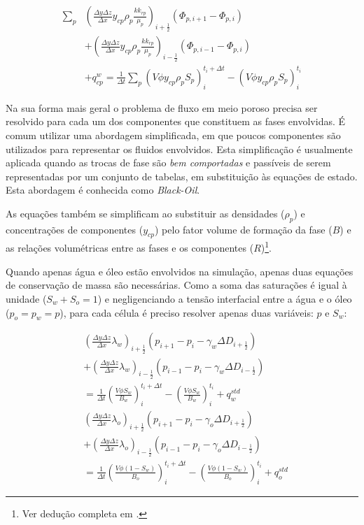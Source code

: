 \documentclass[final,5p]{elsarticle}
\numberwithin{equation}{section}
\begin{document}
        \begin{align}
            \sum_{p} & \left( \frac{\Delta y \Delta z}{\Delta x} y_{cp} \rho_p \frac{k k_{rp}}{\mu_p} \right)_{i+\tfrac{1}{2}} (\Phi_{p,i+1} - \Phi_{p,i})  \nonumber \\
            & + \left( \frac{\Delta y \Delta z}{\Delta x} y_{cp} \rho_p \frac{k k_{rp}}{\mu_p} \right)_{i-\tfrac{1}{2}} (\Phi_{p,i-1} - \Phi_{p,i}) \nonumber \\
            & + q_{cp}^{w} = \frac{1}{\Delta t} \sum_{p} (V \phi y_{cp} \rho_p S_p)_i^{t_i+\Delta t} - (V \phi y_{cp} \rho_p S_p)_i^{t_i} \label{eq:geralumd}
        \end{align}

        Na sua forma mais geral o problema de fluxo em meio poroso precisa ser resolvido para cada um dos componentes que constituem as fases envolvidas. É comum utilizar uma abordagem simplificada, em que poucos componentes são utilizados para representar os fluidos envolvidos. Esta simplificação é usualmente aplicada quando as trocas de fase são \emph{bem comportadas} e passíveis de serem representadas por um conjunto de tabelas, em substituição às equações de estado. Esta abordagem é conhecida como \emph{Black-Oil}.

        As equações também se simplificam ao substituir as densidades ($\rho_p$) e concentrações de componentes ($y_{cp}$) pelo fator volume de formação da fase ($B$) e as relações volumétricas entre as fases e os componentes ($R$)\footnote{Ver dedução completa em \cite{dake1983fundamentals}.}.

        Quando apenas água e óleo estão envolvidos na simulação, apenas duas equações de conservação de massa são necessárias. Como a soma das saturações é igual à unidade ($S_w + S_o = 1$) e negligenciando a tensão interfacial entre a água e o óleo ($p_o = p_w = p$), para cada célula é preciso resolver apenas duas variáveis: $p$ e $S_w$:

        \begin{align}
            &\left( \frac{\Delta y \Delta z}{\Delta x} \lambda_w \right)_{i+\tfrac{1}{2}} (p_{i+1} - p_{i} - \gamma_w \Delta D_{i+\tfrac{1}{2}})  \nonumber \\
            &+ \left( \frac{\Delta y \Delta z}{\Delta x} \lambda_w \right)_{i-\tfrac{1}{2}} (p_{i-1} - p_{i} - \gamma_w \Delta D_{i-\tfrac{1}{2}}) \nonumber \\
            &  = \frac{1}{\Delta t} \left(\frac{V \phi S_w}{B_w}\right)_i^{t_i+\Delta t} - \left(\frac{V \phi S_w}{B_w}\right)_i^{t_i} + q^{std}_w \label{eq:blackoilumdw} \\
            &\left( \frac{\Delta y \Delta z}{\Delta x} \lambda_o \right)_{i+\tfrac{1}{2}} (p_{i+1} - p_{i} - \gamma_o \Delta D_{i+\tfrac{1}{2}})  \nonumber \\
            &+ \left( \frac{\Delta y \Delta z}{\Delta x} \lambda_o \right)_{i-\tfrac{1}{2}} (p_{i-1} - p_{i} - \gamma_o \Delta D_{i-\tfrac{1}{2}}) \nonumber \\
            &  = \frac{1}{\Delta t} \left(\frac{V \phi (1-S_w)}{B_o}\right)_i^{t_i+\Delta t} - \left(\frac{V \phi (1-S_w)}{B_o}\right)_i^{t_i} + q^{std}_o \label{eq:blackoilumdo}
        \end{align}
\end{document}
